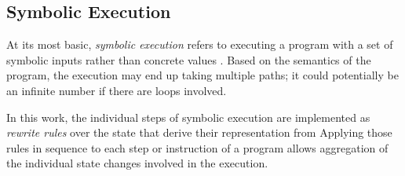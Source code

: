 %
%
%
%
%
%

\subsection{Symbolic Execution}
At its most basic, \emph{symbolic execution} refers to
executing a program with a set of symbolic inputs
rather than concrete values \autocite{king1976symbolic}.
Based on the semantics of the program, the execution may end up taking multiple paths;
it could potentially be an infinite number if there are loops involved.

In this work, the individual steps of symbolic execution
are implemented as \emph{rewrite rules} over the state%
that derive their representation from
Applying those rules in sequence to each step or instruction of a program
allows aggregation of the individual state changes involved in the execution.


